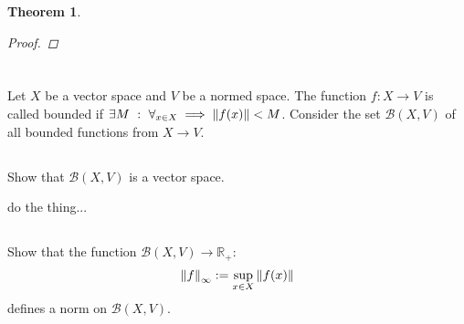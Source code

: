 \documentclass[]{article}
\newcommand{\R}{\mathbb{R}}
\newcommand{\st}{\ : \ }
\newtheorem{theorem}{Theorem}
\begin{document}
\begin{theorem}
\begin{proof}
    \end{proof}
\end{theorem}



\newpage
\section{}
Let $X$ be a vector space and $V$ be a normed space. 
The function $f : X \to V$ is called bounded if $\exists M \st \forall_{x\in X} \implies \norm{f(x)} < M$. 
Consider the set $\mathcal{B}(X,V)$ of all bounded functions from $X \to V$. 

\subsection{}
Show that $\mathcal{B}(X,V)$ is a vector space.


do the thing...




\subsection{}
Show that the function $\mathcal{B}(X,V) \to \R_{+} :$
\[
    \norm{f}_\infty := \sup_{x\in X} \norm{f(x)}
\]
defines a norm on $\mathcal{B}(X,V)$.
\end{document}
